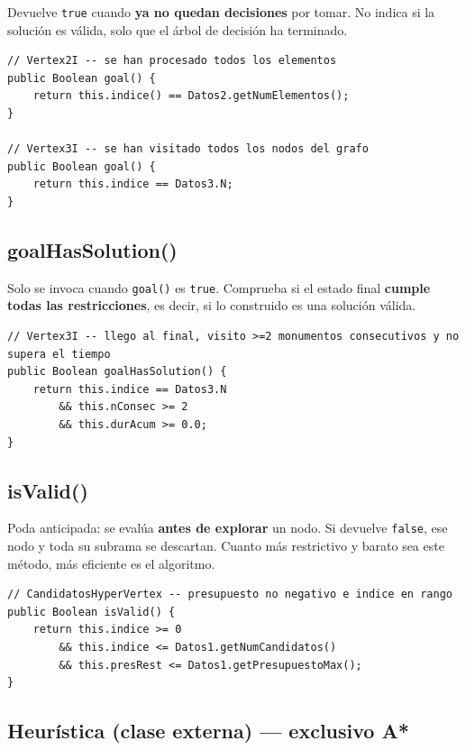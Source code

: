 \documentclass[12pt, a4paper]{article}
\begin{document}
Devuelve \texttt{true} cuando \textbf{ya no quedan decisiones} por tomar. No indica si la solución es válida, solo que el árbol de decisión ha terminado.

\begin{lstlisting}[style=java]
// Vertex2I -- se han procesado todos los elementos
public Boolean goal() {
    return this.indice() == Datos2.getNumElementos();
}

// Vertex3I -- se han visitado todos los nodos del grafo
public Boolean goal() {
    return this.indice == Datos3.N;
}
\end{lstlisting}

\subsection{goalHasSolution()}

Solo se invoca cuando \texttt{goal()} es \texttt{true}. Comprueba si el estado final \textbf{cumple todas las restricciones}, es decir, si lo construido es una solución válida.

\begin{lstlisting}[style=java]
// Vertex3I -- llego al final, visito >=2 monumentos consecutivos y no supera el tiempo
public Boolean goalHasSolution() {
    return this.indice == Datos3.N
        && this.nConsec >= 2
        && this.durAcum >= 0.0;
}
\end{lstlisting}

\subsection{isValid()}

Poda anticipada: se evalúa \textbf{antes de explorar} un nodo. Si devuelve \texttt{false}, ese nodo y toda su subrama se descartan. Cuanto más restrictivo y barato sea este método, más eficiente es el algoritmo.

\begin{lstlisting}[style=java]
// CandidatosHyperVertex -- presupuesto no negativo e indice en rango
public Boolean isValid() {
    return this.indice >= 0
        && this.indice <= Datos1.getNumCandidatos()
        && this.presRest <= Datos1.getPresupuestoMax();
}
\end{lstlisting}

\subsection{Heurística (clase externa) --- exclusivo A*}
\end{document}
